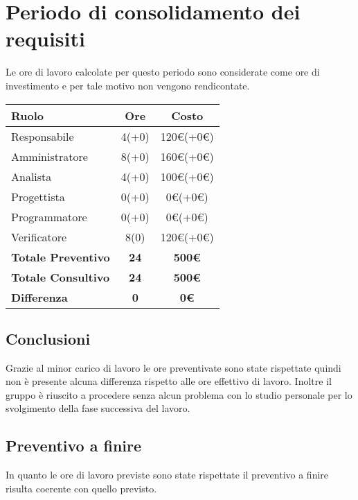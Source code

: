 {\section{Periodo di consolidamento dei requisiti}\label{ConsuntivoPeriodoDiConsolidamentoDeiRequisiti}
Le ore di lavoro calcolate per questo periodo sono considerate come ore di investimento e per tale motivo non vengono rendicontate.

\quad
\def\tabularxcolumn#1{m{#1}}
{
	\begin{center}
		\renewcommand{\arraystretch}{1.4}
		\begin{tabularx}{10cm}{|X|c|c|}
			\hline
			\rowcolor{airforceblue}
			\textbf{Ruolo} & \textbf{Ore} & \textbf{Costo}\\
			\hline
			Responsabile & 4(+0) & 120\euro(+0\euro)\\
			\hline
			Amministratore & 8(+0) & 160\euro(+0\euro)\\
			\hline
			Analista & 4(+0) & 100\euro(+0\euro)\\
			\hline
			Progettista & 0(+0) & 0\euro(+0\euro)\\
			\hline
			Programmatore & 0(+0) & 0\euro(+0\euro)\\
			\hline
			Verificatore & 8(0) & 120\euro(+0\euro)\\
			\hline
			\textbf{Totale Preventivo} & \textbf{24} & \textbf{500\euro}\\
			\hline
			\textbf{Totale Consultivo} & \textbf{24} & \textbf{500\euro}\\
			\hline
			\textbf{Differenza} & \textbf{0} & \textbf{0\euro}
		\end{tabularx}
	\end{center}

\subsection{Conclusioni}\label{ConsuntivoPeriodoDiConsolidamentoDeiRequisitiConclusioni}
Grazie al minor carico di lavoro le ore preventivate sono state rispettate quindi non è presente alcuna differenza rispetto alle ore effettivo di lavoro. Inoltre il gruppo è riuscito a procedere senza alcun problema con lo studio personale per lo svolgimento della fase successiva del lavoro.

\subsection{Preventivo a finire}\label{ConsuntivoPeriodoDiConsolidamentoDeiRequisitiPreventivoAFinire}
In quanto le ore di lavoro previste sono state rispettate il preventivo a finire risulta coerente con quello previsto.

}}
